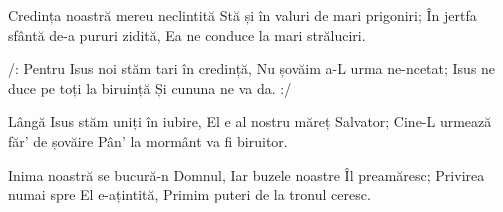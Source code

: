 \beginverse
Credința noastră mereu neclintită
Stă și în valuri de mari prigoniri;
În jertfa sfântă de-a pururi zidită,
Ea ne conduce la mari străluciri.
\endverse

\beginchorus
/: Pentru Isus noi stăm tari în credință,
Nu șovăim a-L urma ne-ncetat;
Isus ne duce pe toți la biruință
Și cununa ne va da. :/
\endchorus

\beginverse
Lângă Isus stăm uniți în iubire,
El e al nostru măreț Salvator;
Cine-L urmează făr’ de șovăire
Pân’ la mormânt va fi biruitor.
\endverse

\beginverse
Inima noastră se bucură-n Domnul,
Iar buzele noastre Îl preamăresc;
Privirea numai spre El e-ațintită,
Primim puteri de la tronul ceresc.
\endverse
\endsong